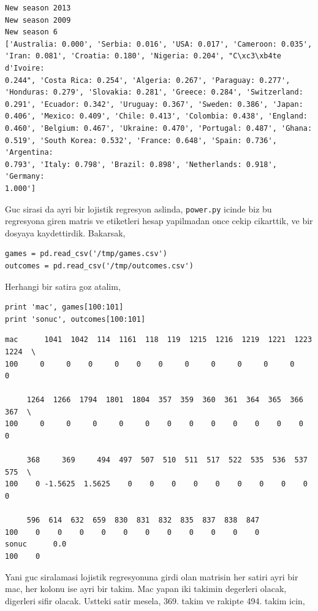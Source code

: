 \documentclass[12pt,fleqn]{article}\usepackage{../common}
\begin{document}
\begin{verbatim}
New season 2013
New season 2009
New season 6
['Australia: 0.000', 'Serbia: 0.016', 'USA: 0.017', 'Cameroon: 0.035',
'Iran: 0.081', 'Croatia: 0.180', 'Nigeria: 0.204', "C\xc3\xb4te d'Ivoire:
0.244", 'Costa Rica: 0.254', 'Algeria: 0.267', 'Paraguay: 0.277',
'Honduras: 0.279', 'Slovakia: 0.281', 'Greece: 0.284', 'Switzerland:
0.291', 'Ecuador: 0.342', 'Uruguay: 0.367', 'Sweden: 0.386', 'Japan:
0.406', 'Mexico: 0.409', 'Chile: 0.413', 'Colombia: 0.438', 'England:
0.460', 'Belgium: 0.467', 'Ukraine: 0.470', 'Portugal: 0.487', 'Ghana:
0.519', 'South Korea: 0.532', 'France: 0.648', 'Spain: 0.736', 'Argentina:
0.793', 'Italy: 0.798', 'Brazil: 0.898', 'Netherlands: 0.918', 'Germany:
1.000'] 
\end{verbatim}

Guc sirasi da ayri bir lojistik regresyon aslinda, \verb!power.py! icinde
biz bu regresyona giren matris ve etiketleri hesap yapilmadan once cekip
cikarttik, ve bir dosyaya kaydettirdik. Bakarsak,

\begin{verbatim}
games = pd.read_csv('/tmp/games.csv')
outcomes = pd.read_csv('/tmp/outcomes.csv')
\end{verbatim}

Herhangi bir satira goz atalim,

\begin{verbatim}
print 'mac', games[100:101]
print 'sonuc', outcomes[100:101]
\end{verbatim}

\begin{verbatim}
mac      1041  1042  114  1161  118  119  1215  1216  1219  1221  1223  1224  \
100     0     0    0     0    0    0     0     0     0     0     0     0   

     1264  1266  1794  1801  1804  357  359  360  361  364  365  366  367  \
100     0     0     0     0     0    0    0    0    0    0    0    0    0   

     368     369     494  497  507  510  511  517  522  535  536  537  575  \
100    0 -1.5625  1.5625    0    0    0    0    0    0    0    0    0    0   

     596  614  632  659  830  831  832  835  837  838  847  
100    0    0    0    0    0    0    0    0    0    0    0  
sonuc      0.0
100    0
\end{verbatim}

Yani guc siralamasi lojistik regresyonuna girdi olan matrisin her satiri
ayri bir mac, her kolonu ise ayri bir takim. Mac yapan iki takimin
degerleri olacak, digerleri sifir olacak. Ustteki satir mesela, 369. takim
ve rakipte 494. takim icin,
\end{document}
